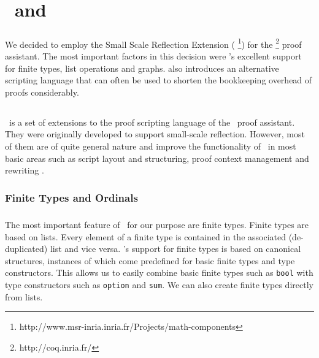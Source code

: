 \chapter{\coq\ and \ssreflect}

\paragraph{}
We decided to employ the Small Scale Reflection Extension (\textbf{\ssreflect}%
\footnote{http://www.msr-inria.inria.fr/Projects/math-components})
for the \textbf{\coq}%
\footnote{http://coq.inria.fr/}
proof assistant. 
The most important factors in this decision were \ssreflect's excellent support for finite types, list operations and graphs. \ssreflect{} also introduces an alternative scripting language that can often be used to shorten the bookkeeping overhead of proofs considerably.

\section{\coq}

\paragraph{}

\section{\ssreflect}

\paragraph{}
\ssreflect\ is a set of extensions to the proof scripting language of the \coq\ proof assistant. 
They were originally developed to support small-scale reflection. 
However, most of them are of quite general nature and improve the functionality of \coq\ in most basic areas such as script layout and structuring, proof context management and rewriting \cite{gonthier:inria-00258384}.

\subsection{Finite Types and Ordinals}
\paragraph{}
The most important feature of \ssreflect\ for our purpose are finite types. 
Finite types are based on lists. 
Every element of a finite type is contained in the associated (de-duplicated) list and vice versa.
\ssreflect's support for finite types is based on canonical structures, instances of which come predefined for basic finite types and type constructors. 
This allows us to easily combine basic finite types such as \lstinline{bool} with type constructors such as \lstinline{option} and \lstinline{sum}. 
We can also create finite types directly from lists.

